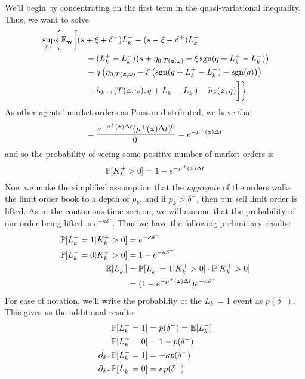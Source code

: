 We'll begin by concentrating on the first term in the quasi-variational inequality. Thus, we want to solve
\begin{equation}
\label{eq:discretesup1}
\begin{split}
& \sup_{\delta^\pm} \biggl\lbrace \E_{\bw} \biggl[
(s + \xi + \delta^-)L_k^- - (s - \xi - \delta^+)L_k^+ \\
& \hphantom{\sup_{\bu} \biggl\lbrace \E_{\bw} \biggl[ {}+{}} + (L_k^+ - L_k^-) \bigl( s + \eta_{0,T(\bz, \omega)}  -\xi\sgn( q + L_k^+ - L_k^-)   \bigr) \\
& \hphantom{\sup_{\bu} \biggl\lbrace \E_{\bw} \biggl[ {}+{}} + q\left( \eta_{0,T(\bz, \omega)}  -\xi\left( \sgn( q + L_k^+ - L_k^-) - \sgn(q) \right)  \right) \\
& \hphantom{\sup_{\bu} \biggl\lbrace \E_{\bw} \biggl[ {}+{}} + h_{k+1}(T(\bz,\omega), q + L_k^+ - L_k^- ) -  h_k(\bz,q) \biggr] \biggr\rbrace
\end{split}
\end{equation}
As other agents' market orders as Poisson distributed, we have that 
\begin{equation}
[ K_k^+ = 0] = \frac{e^{-\mu^+ (\bz) \Delta t} (\mu^+ (\bz) \Delta t)^0}{0!} = e^{-\mu^+ (\bz) \Delta t}
\end{equation}
and so the probability of seeing some positive number of market orders is
\begin{equation}
\label{eq:discretepositiveKplus}
\mathbb{P} [ K_k^+ > 0] = 1 - e^{-\mu^+ (\bm{z}) \Delta t}
\end{equation}
Now we make the simplified assumption that the \textit{aggregate} of the orders walks the limit order book to a depth of $p_k$, and if $p_k > \delta^-$, then our sell limit order is lifted. As in the continuous time section, we will assume that the probability of our order being lifted is $e^{-\kappa \delta^-}$. Thus we have the following preliminary results:
\begin{align}
\mathbb{P} [ L_k^- = 1 | K_k^+ > 0] & = e^{-\kappa \delta^-} \\
\mathbb{P} [ L_k^- = 0 | K_k^+ > 0] & = 1 - e^{-\kappa \delta^-} \\
\mathbb{E} [ L_k^- ] & = \mathbb{P} [ L_k^- = 1 | K_k^+ > 0] \cdot \mathbb{P}[K_k^+ > 0] \\
& = ( 1 - e^{-\mu^+ (\bm{z}) \Delta t} ) e^{-\kappa \delta^-}
\end{align}
For ease of notation, we'll write the probability of the $L_k^- = 1$ event as $p(\delta^-)$. This gives us the additional results:
\begin{align}
\mathbb{P} [ L_k^- = 1] & = p(\delta^-) = \mathbb{E} [ L_k^-] \\
\mathbb{P} [ L_k^- = 0] & = 1 - p(\delta^-) \\
\partial_{\delta^-} \mathbb{P} [ L_k^- = 1]  & = -\kappa p(\delta^-) \\
\partial_{\delta^-} \mathbb{P} [ L_k^- = 0] & = \kappa p(\delta^-)
\end{align}
